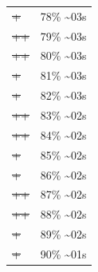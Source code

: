 \documentclass[12pt]{article}
\begin{document}
\begin{center}
\begin{tabular}{ll}
\sout{\sout{\sout{\sout{\sout{\sout{\sout{\sout{\sout{\sout{\sout{\sout{\sout{\sout{\sout{\sout{\sout{\sout{\sout{+}}}}}}}}}}}}}}}}}}} & 78\% \textasciitilde{}03s\\
\sout{\sout{\sout{\sout{\sout{\sout{\sout{\sout{\sout{\sout{\sout{\sout{\sout{\sout{\sout{\sout{\sout{\sout{\sout{++}}}}}}}}}}}}}}}}}}} & 79\% \textasciitilde{}03s\\
\sout{\sout{\sout{\sout{\sout{\sout{\sout{\sout{\sout{\sout{\sout{\sout{\sout{\sout{\sout{\sout{\sout{\sout{\sout{++}}}}}}}}}}}}}}}}}}} & 80\% \textasciitilde{}03s\\
\sout{\sout{\sout{\sout{\sout{\sout{\sout{\sout{\sout{\sout{\sout{\sout{\sout{\sout{\sout{\sout{\sout{\sout{\sout{\sout{+}}}}}}}}}}}}}}}}}}}} & 81\% \textasciitilde{}03s\\
\sout{\sout{\sout{\sout{\sout{\sout{\sout{\sout{\sout{\sout{\sout{\sout{\sout{\sout{\sout{\sout{\sout{\sout{\sout{\sout{+}}}}}}}}}}}}}}}}}}}} & 82\% \textasciitilde{}03s\\
\sout{\sout{\sout{\sout{\sout{\sout{\sout{\sout{\sout{\sout{\sout{\sout{\sout{\sout{\sout{\sout{\sout{\sout{\sout{\sout{++}}}}}}}}}}}}}}}}}}}} & 83\% \textasciitilde{}02s\\
\sout{\sout{\sout{\sout{\sout{\sout{\sout{\sout{\sout{\sout{\sout{\sout{\sout{\sout{\sout{\sout{\sout{\sout{\sout{\sout{++}}}}}}}}}}}}}}}}}}}} & 84\% \textasciitilde{}02s\\
\sout{\sout{\sout{\sout{\sout{\sout{\sout{\sout{\sout{\sout{\sout{\sout{\sout{\sout{\sout{\sout{\sout{\sout{\sout{\sout{\sout{+}}}}}}}}}}}}}}}}}}}}} & 85\% \textasciitilde{}02s\\
\sout{\sout{\sout{\sout{\sout{\sout{\sout{\sout{\sout{\sout{\sout{\sout{\sout{\sout{\sout{\sout{\sout{\sout{\sout{\sout{\sout{+}}}}}}}}}}}}}}}}}}}}} & 86\% \textasciitilde{}02s\\
\sout{\sout{\sout{\sout{\sout{\sout{\sout{\sout{\sout{\sout{\sout{\sout{\sout{\sout{\sout{\sout{\sout{\sout{\sout{\sout{\sout{++}}}}}}}}}}}}}}}}}}}}} & 87\% \textasciitilde{}02s\\
\sout{\sout{\sout{\sout{\sout{\sout{\sout{\sout{\sout{\sout{\sout{\sout{\sout{\sout{\sout{\sout{\sout{\sout{\sout{\sout{\sout{++}}}}}}}}}}}}}}}}}}}}} & 88\% \textasciitilde{}02s\\
\sout{\sout{\sout{\sout{\sout{\sout{\sout{\sout{\sout{\sout{\sout{\sout{\sout{\sout{\sout{\sout{\sout{\sout{\sout{\sout{\sout{\sout{+}}}}}}}}}}}}}}}}}}}}}} & 89\% \textasciitilde{}02s\\
\sout{\sout{\sout{\sout{\sout{\sout{\sout{\sout{\sout{\sout{\sout{\sout{\sout{\sout{\sout{\sout{\sout{\sout{\sout{\sout{\sout{\sout{+}}}}}}}}}}}}}}}}}}}}}} & 90\% \textasciitilde{}01s\\

\end{tabular}
\end{center}
\end{document}
